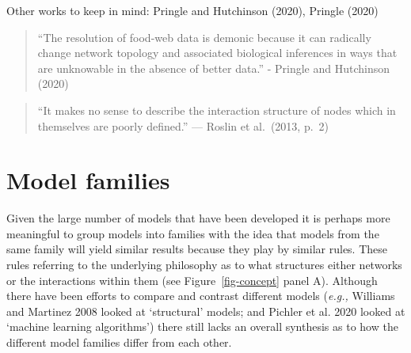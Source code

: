 \documentclass[
  letterpaper,
  DIV=11,
  numbers=noendperiod]{scrartcl}
\begin{document}
Other works to keep in mind: Pringle and Hutchinson (2020), Pringle
(2020)

\begin{quote}
``The resolution of food-web data is demonic because it can radically
change network topology and associated biological inferences in ways
that are unknowable in the absence of better data.'' - Pringle and
Hutchinson (2020)
\end{quote}

\begin{quote}
``It makes no sense to describe the interaction structure of nodes which
in themselves are poorly defined.'' --- Roslin et al.~(2013, p.~2)
\end{quote}

\section{Model families}\label{model-families}

Given the large number of models that have been developed it is perhaps
more meaningful to group models into families with the idea that models
from the same family will yield similar results because they play by
similar rules. These rules referring to the underlying philosophy as to
what structures either networks or the interactions within them (see
Figure~\ref{fig-concept} panel A). Although there have been efforts to
compare and contrast different models (\emph{e.g.,} Williams and
Martinez 2008 looked at `structural' models; and Pichler et al. 2020
looked at `machine learning algorithms') there still lacks an overall
synthesis as to how the different model families differ from each other.
\end{document}
